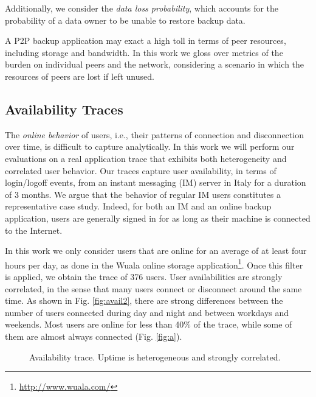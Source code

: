 \documentclass[conference,10pt]{IEEEtran}
\begin{document}
Additionally, we consider the \emph{data loss probability}, which
accounts for the probability of a data owner to be unable to restore
backup data.

A P2P backup application may exact a high toll in terms of peer
resources, including storage and bandwidth. In this work we gloss over
metrics of the burden on individual peers and the network, considering
a scenario in which the resources of peers are lost if left unused.

\subsection{Availability Traces}
\label{sec:availability_trace}

The \emph{online behavior} of users, i.e., their patterns of
connection and disconnection over time, is difficult to capture
analytically. In this work we will perform our evaluations on a real
application trace that exhibits both heterogeneity and correlated user
behavior. Our traces capture user availability, in terms of
login/logoff events, from an instant messaging (IM) server in Italy
for a duration of 3 months. We argue that the behavior of regular IM
users constitutes a representative case study. Indeed, for both an IM
and an online backup application, users are generally signed in for as
long as their machine is connected to the Internet.

In this work we only consider users that are online for an average of
at least four hours per day, as done in the Wuala online storage
application\footnote{\url{http://www.wuala.com/}}. Once this filter is
applied, we obtain the trace of 376 users. User availabilities are
strongly correlated, in the sense that many users connect or
disconnect around the same time. As shown in Fig. \ref{fig:avail2},
there are strong differences between the number of users connected
during day and night and between workdays and weekends. Most users are
online for less than 40\% of the trace, while some of them are almost
always connected (Fig. \ref{fig:a}).

\begin{figure}
\centering
\caption{Availability trace. Uptime is heterogeneous and strongly
  correlated.}
\label{fig:basics}
\end{figure}
\end{document}
